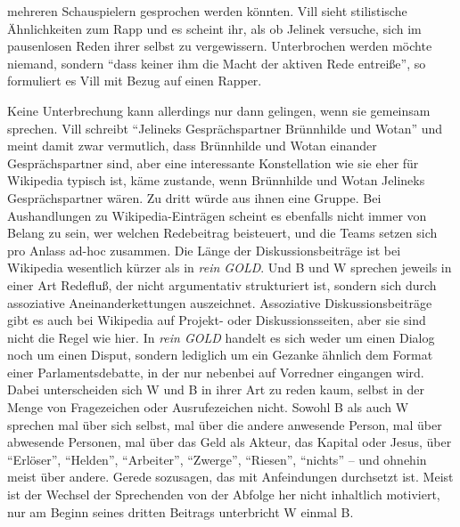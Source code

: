 \documentclass[fontsize=12pt]{scrartcl}
\begin{document}
meh\-reren Schauspielern\textsuperscript{\tiny *} gesprochen werden k\"onnten. Vill sieht stilistische \"Ahnlichkei\-ten zum Rapp und es scheint ihr, als ob Jelinek versuche, sich im pausenlosen Reden ihrer \mbox{selbst} zu vergewissern. Unterbrochen werden m\"ochte niemand, sondern "`dass keiner ihm die Macht der aktiven Rede entrei{\ss}e"', so formuliert es Vill mit Bezug auf einen Rapper. 

Keine Unterbrechung kann al\-ler\-dings nur dann gelingen, wenn sie gemeinsam spre\-chen. Vill schreibt "`Jelineks Gespr\"achspartner Br\"unnhilde und Wotan"' und meint damit zwar vermutlich, dass Br\"unnhilde und Wotan einander Gespr\"achspartner sind, aber eine interessante Konstellation wie sie eher f\"ur Wi\-ki\-pe\-dia ty\-pisch ist, k\"ame zu\-stan\-de, wenn Br\"unnhilde und Wotan Jelineks Gespr\"achspartner w\"aren. Zu dritt w\"urde aus ihnen eine Gruppe. Bei Aushandlungen zu Wi\-ki\-pe\-dia-Eintr\"agen scheint es ebenfalls nicht immer von Belang zu sein, wer welchen Redebeitrag beisteuert, und die Teams setzen sich pro Anlass ad-hoc zusammen. Die L\"ange der Dis\-kus\-si\-onsbeitr\"age ist bei Wi\-ki\-pe\-dia we\-sent\-lich k\"urzer als in \textit{rein GOLD}. Und B und W sprechen jeweils in einer Art Redeflu{\ss}, der nicht argumentativ strukturiert ist, sondern sich durch assoziative Aneinanderkettungen auszeichnet. Assoziative Dis\-kus\-si\-onsbeitr\"age gibt es auch bei Wi\-ki\-pe\-dia auf Projekt- oder Dis\-kus\-si\-onssei\-ten, aber sie sind nicht die Regel wie \mbox{hier}. In \textit{rein GOLD} handelt es sich weder um einen Dialog noch um einen Disput, sondern lediglich um ein Gezanke \"ahnlich dem Format einer Parlamentsdebatte, in der nur nebenbei auf Vorredner\textsuperscript{\tiny *} eingangen wird. 
Dabei unterscheiden sich W und B in ihrer Art zu reden kaum, \mbox{selbst} in der Menge von Fragezeichen oder Ausrufe\-zei\-chen nicht. Sowohl B als auch W sprechen mal \"uber sich \mbox{selbst}, mal \"uber die andere anwesende Person, mal \"uber abwesende Per\-so\-nen, mal \"uber das Geld als Akteur\textsuperscript{\tiny *}, das Kapital oder Jesus, \"uber "`Erl\"oser"', "`Helden"', "`Arbeiter"', "`Zwerge"', "`Riesen"', "`nichts"' -- und ohnehin meist \"uber andere. Gerede sozusagen, das mit Anfeindungen durchsetzt ist. Meist ist der Wechsel der Sprechenden von der Abfolge her nicht inhaltlich motiviert, nur am Beginn seines dritten Beitrags unterbricht W einmal B. 
\end{document}
